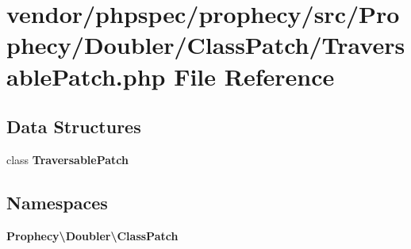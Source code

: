 \section{vendor/phpspec/prophecy/src/\+Prophecy/\+Doubler/\+Class\+Patch/\+Traversable\+Patch.php File Reference}
\label{_traversable_patch_8php}
\subsection*{Data Structures}
\begin{DoxyCompactItemize}
\item 
class {\bf Traversable\+Patch}
\end{DoxyCompactItemize}
\subsection*{Namespaces}
\begin{DoxyCompactItemize}
\item 
 {\bf Prophecy\textbackslash{}\+Doubler\textbackslash{}\+Class\+Patch}
\end{DoxyCompactItemize}
